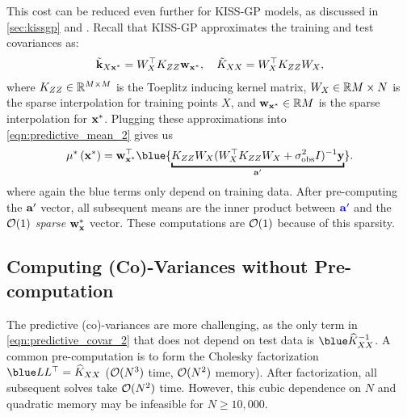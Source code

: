 This cost can be reduced even further for KISS-GP models, as discussed in \cref{sec:kissgp} and \citep{wilson2015thoughts}.
Recall that KISS-GP approximates the training and test covariances as:
%
\begin{align*}
  \tilde{\mathbf{k}}_{X \mathbf{x}^*} = W^\top_{X} K_{Z Z} \mathbf{w}_{\mathbf{x}^*},
  \quad
  \tilde{K}_{X X} = W^\top_{X} K_{Z Z} W_{X},
\end{align*}
%
where $K_{ZZ} \in \mathbb{R}^{M \times M}$ is the Toeplitz inducing kernel matrix, $W_{X} \in \mathbb{R}{M \times N}$ is the sparse interpolation for training points $X$, and $\mathbf{w}_{\mathbf{x}^*} \in \mathbb{R}{M}$ is the sparse interpolation for $\mathbf{x}^*$.
Plugging these approximations into \cref{eqn:predictive_mean_2} gives us
\[
  \meantest{\bxtest} = \bw_{\bxtest}^\top {\blue{\underbracket{\bK_{\bZ\bZ} \bW_{\bX}(\bW_{\bX}^{\top}\bK_{\bZ\bZ}\bW_{\bX} + \sigma_\text{obs}^{2} \bI)^{-1} \by}_{\ba'}}}.
\]
where again the blue terms only depend on training data.
After pre-computing the $\mathbf{a}'$ vector, all subsequent means are the inner product between $\color{blue} \mathbf{a}'$ and the \emph{$\bigo{1}$ sparse} $\bw_\bxtest$ vector.
These computations are $\bigo{1}$ because of this sparsity.

\subsection{Computing (Co)-Variances without Pre-computation}

The predictive (co)-variances are more challenging, as the only term in \cref{eqn:predictive_covar_2} that does not depend on test data is $\blue \trainK^{-1}$.
A common pre-computation is to form the Cholesky factorization $\blue \bL \bL^\top = \trainK$ ($\bigo{N^3}$ time, $\bigo{N^2}$ memory).
After factorization, all subsequent solves take $\bigo{N^2}$ time.
However, this cubic dependence on $N$ and quadratic memory may be infeasible for $N \geq 10,\!000$.

